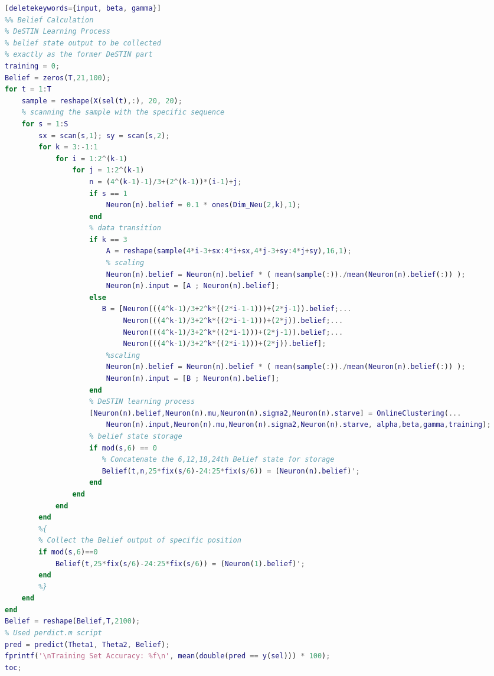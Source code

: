 \begin{spacing}{1}
\begin{lstlisting}[language=Matlab][deletekeywords={input, beta, gamma}]
%% Belief Calculation
% DeSTIN Learning Process
% belief state output to be collected
% exactly as the former DeSTIN part
training = 0;
Belief = zeros(T,21,100);
for t = 1:T
    sample = reshape(X(sel(t),:), 20, 20);
    % scanning the sample with the specific sequence
    for s = 1:S
        sx = scan(s,1); sy = scan(s,2);
        for k = 3:-1:1
            for i = 1:2^(k-1)
                for j = 1:2^(k-1)
                    n = (4^(k-1)-1)/3+(2^(k-1))*(i-1)+j;
                    if s == 1
                        Neuron(n).belief = 0.1 * ones(Dim_Neu(2,k),1);
                    end
                    % data transition
                    if k == 3
                        A = reshape(sample(4*i-3+sx:4*i+sx,4*j-3+sy:4*j+sy),16,1);
                        % scaling
                        Neuron(n).belief = Neuron(n).belief * ( mean(sample(:))./mean(Neuron(n).belief(:)) );
                        Neuron(n).input = [A ; Neuron(n).belief];
                    else
                       B = [Neuron(((4^k-1)/3+2^k*((2*i-1-1)))+(2*j-1)).belief;...
                            Neuron(((4^k-1)/3+2^k*((2*i-1-1)))+(2*j)).belief;...
                            Neuron(((4^k-1)/3+2^k*((2*i-1)))+(2*j-1)).belief;...
                            Neuron(((4^k-1)/3+2^k*((2*i-1)))+(2*j)).belief];
                        %scaling
                        Neuron(n).belief = Neuron(n).belief * ( mean(sample(:))./mean(Neuron(n).belief(:)) );
                        Neuron(n).input = [B ; Neuron(n).belief];
                    end
                    % DeSTIN learning process
                    [Neuron(n).belief,Neuron(n).mu,Neuron(n).sigma2,Neuron(n).starve] = OnlineClustering(...
                        Neuron(n).input,Neuron(n).mu,Neuron(n).sigma2,Neuron(n).starve, alpha,beta,gamma,training);
                    % belief state storage
                    if mod(s,6) == 0
                       % Concatenate the 6,12,18,24th Belief state for storage
                       Belief(t,n,25*fix(s/6)-24:25*fix(s/6)) = (Neuron(n).belief)';
                    end
                end
            end
        end
        %{
        % Collect the Belief output of specific position
        if mod(s,6)==0
            Belief(t,25*fix(s/6)-24:25*fix(s/6)) = (Neuron(1).belief)'; 
        end
        %}
    end
end
Belief = reshape(Belief,T,2100);
% Used perdict.m script
pred = predict(Theta1, Theta2, Belief);
fprintf('\nTraining Set Accuracy: %f\n', mean(double(pred == y(sel))) * 100);
toc;


\end{lstlisting}
\end{spacing}


